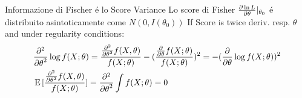 \documentclass[asd-beamer.tex]{subfiles}%
\begin{document}
\begin{frame}{Informazione di Fischer \'e lo Score Variance}\frameintoc
    Lo score di Fisher $\frac{\partial \ln{L}}{\partial \theta}|_{\theta_0}$ \'e distribuito asintoticamente come $N(0,I(\theta_0))$
If Score is twice deriv. resp. $\theta$ and under regularity conditions:
\begin{align*}
&\frac{\partial^2}{{\partial \theta}^2}\log{f(X;\theta)}=\frac{\frac{\partial^2}{{\partial \theta}^2}f(X,\theta)}{f(X;\theta)}-(\frac{\frac{\partial}{\partial \theta}f(X;\theta)}{f(X;\theta)})^2=-(\frac{\partial}{\partial \theta}\log{f(X;\theta)})^2\\
&\operatorname{E}{[\frac{\frac{\partial^2}{{\partial \theta}^2}f(X,\theta)}{f(X;\theta)}]}=\frac{\partial^2}{{\partial \theta}^2}\int f(X;\theta)=0
\end{align*}
\end{frame}
\end{document}
